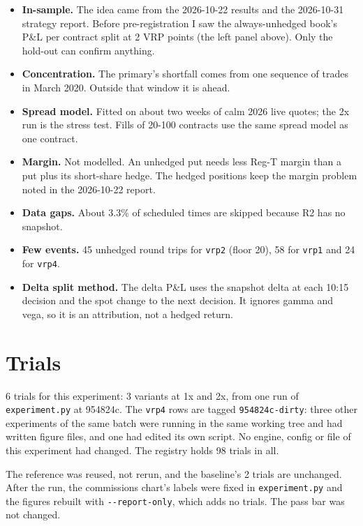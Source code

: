 \documentclass{article}
\begin{document}
\begin{itemize}

\item \textbf{In-sample.} The idea came from the 2026-10-22 results and the 2026-10-31 strategy report. Before pre-registration I saw the always-unhedged book's P\&L per contract split at 2 VRP points (the left panel above). Only the hold-out can confirm anything.

\item \textbf{Concentration.} The primary's shortfall comes from one sequence of trades in March 2020. Outside that window it is ahead.

\item \textbf{Spread model.} Fitted on about two weeks of calm 2026 live quotes; the 2x run is the stress test. Fills of 20-100 contracts use the same spread model as one contract.

\item \textbf{Margin.} Not modelled. An unhedged put needs less Reg-T margin than a put plus its short-share hedge. The hedged positions keep the margin problem noted in the 2026-10-22 report.

\item \textbf{Data gaps.} About 3.3\% of scheduled times are skipped because R2 has no snapshot.

\item \textbf{Few events.} 45 unhedged round trips for \texttt{vrp2} (floor 20), 58 for \texttt{vrp1} and 24 for \texttt{vrp4}.

\item \textbf{Delta split method.} The delta P\&L uses the snapshot delta at each 10:15 decision and the spot change to the next decision. It ignores gamma and vega, so it is an attribution, not a hedged return.

\end{itemize}

\section{Trials}

6 trials for this experiment: 3 variants at 1x and 2x, from one run of \texttt{experiment.\allowbreak{}py} at 954824c. The \texttt{vrp4} rows are tagged \texttt{954824c-\allowbreak{}dirty}: three other experiments of the same batch were running in the same working tree and had written figure files, and one had edited its own script. No engine, config or file of this experiment had changed. The registry holds 98 trials in all.

The reference was reused, not rerun, and the baseline's 2 trials are unchanged. After the run, the commissions chart's labels were fixed in \texttt{experiment.\allowbreak{}py} and the figures rebuilt with \texttt{-\allowbreak{}-\allowbreak{}report-\allowbreak{}only}, which adds no trials. The pass bar was not changed.
\end{document}

